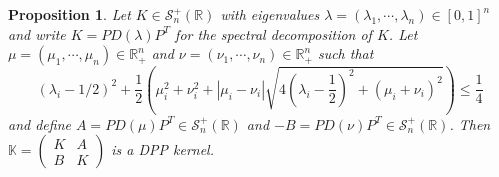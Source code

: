 \documentclass{article}
\numberwithin{equation}{section}
\renewcommand{\leq}{\leqslant}
\newcommand{\bR}{\mathbb{R}}
\theoremstyle{plain}
\newtheorem{proposition}{Proposition}[section]
\begin{document}
\begin{proposition}\label{prop: Construction_Coupling}
Let $K\in\mathcal{S}^+_n(\bR)$ with eigenvalues $\lambda=(\lambda_1,\cdots,\lambda_n)\in[0, 1]^n$ and write $K=PD(\lambda)P^T$ for the spectral decomposition of $K$. Let $\mu=(\mu_1,\cdots,\mu_n)\in\bR_+^n$ and $\nu=(\nu_1,\cdots,\nu_n)\in\bR_+^n$ such that
\begin{equation}\label{eq: Bound_ev}
(\lambda_i-1/2)^2 + \frac{1}{2}\left(\mu_i^2+\nu_i^2 + |\mu_i-\nu_i|\sqrt{4\left(\lambda_i-\frac{1}{2}\right)^2+(\mu_i+\nu_i)^2}\right)\leq\frac{1}{4}
\end{equation}
and define $A=PD(\mu)P^T\in\mathcal{S}^+_n(\bR)$ and $-B=PD(\nu)P^T\in\mathcal{S}^+_n(\bR)$. Then $\mathbb{K}=\begin{pmatrix}
K & A \\ B & K
\end{pmatrix}$ is a DPP kernel.
\end{proposition}
\end{document}
